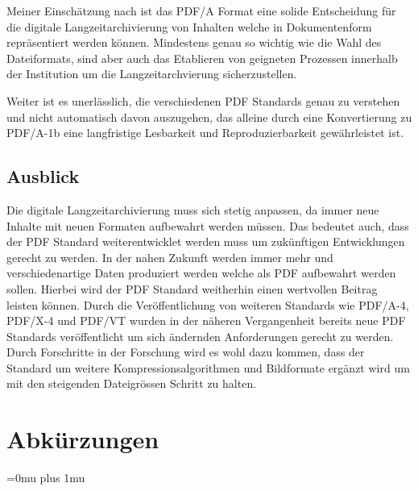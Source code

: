 \documentclass[a4paper,oneside, 12pt]{report}
\begin{document}
Meiner Einschätzung nach ist das PDF/A Format eine solide Entscheidung für die digitale Langzeitarchivierung von Inhalten welche in Dokumentenform repräsentiert werden können. Mindestens genau so wichtig wie die Wahl des Dateiformats, sind aber auch das Etablieren von geigneten Prozessen innerhalb der Institution um die Langzeitarchvierung sicherzustellen.

Weiter ist es unerlässlich, die verschiedenen PDF Standards genau zu verstehen und nicht automatisch davon auszugehen, das alleine durch eine Konvertierung zu PDF/A-1b eine langfristige Lesbarkeit und Reproduzierbarkeit gewährleistet ist.

\section{Ausblick}
Die digitale Langzeitarchivierung muss sich stetig anpassen, da immer neue Inhalte mit neuen Formaten aufbewahrt werden müssen. Das bedeutet auch, dass der PDF Standard weiterentwicklet werden muss um zukünftigen Entwicklungen gerecht zu werden. In der nahen Zukunft werden immer mehr und verschiedenartige Daten produziert werden welche als PDF aufbewahrt werden sollen. Hierbei wird der PDF Standard weitherhin einen wertvollen Beitrag leisten können. Durch die Veröffentlichung von weiteren Standards wie PDF/A-4, PDF/X-4 und PDF/VT wurden in der näheren Vergangenheit bereits neue PDF Standards veröffentlicht um sich ändernden Anforderungen gerecht zu werden. Durch Forschritte in der Forschung wird es wohl dazu kommen, dass der Standard um weitere Kompressionsalgorithmen und Bildformate ergänzt wird um mit den steigenden Dateigrössen Schritt zu halten.


\cleardoublepage
{}
{}
\chapter*{Abkürzungen}
\begin{acronym}[Abkürzungen]
\end{acronym}

\cleardoublepage
{}
{}
\Urlmuskip=0mu plus 1mu\relax
\end{document}
